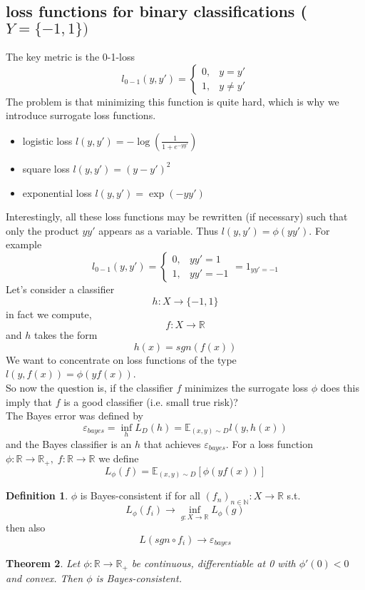 \documentclass[a4paper, 12pt]{article}
\theoremstyle{plain}
\newtheorem{theorem}{Theorem}[subsection] %
\theoremstyle{definition}
\newtheorem{definition}[theorem]{Definition} %
\theoremstyle{lemma}
\theoremstyle{remark}
\theoremstyle{example}
\begin{document}
	\subsection{loss functions for binary classifications ($Y = \{-1,1\})$}
	The key metric is the 0-1-loss \[l_{0-1}(y,y') = \begin{cases}
		0, & y=y'\\
		1, & y\neq y'
	\end{cases}\]
	The problem is that minimizing this function is quite hard, which is why we introduce surrogate loss functions. \begin{itemize}
		\item logistic loss $l(y,y') = -\log\left(\frac{1}{1+e^{-yy'}}\right)$
		\item square loss $l(y,y') = (y-y')^2$
		\item exponential loss $l(y,y') = \exp(-yy')$
	\end{itemize}
	Interestingly, all these loss functions may be rewritten (if necessary) such that only the product $yy'$ appears as a variable. Thus $l(y,y') = \phi(yy')$. For example \[l_{0-1}(y,y') = \begin{cases}
		0, & yy'= 1\\
		1, & yy' = -1
	\end{cases} = 1_{yy'=-1}\]
	Let's consider a classifier \[h:X\to\{-1,1\}\] in fact we compute, \[f:X\to\mathbb{R}\] and $h$ takes the form \[h(x) = sgn(f(x))\]
	We want to concentrate on loss functions of the type $l(y,f(x)) = \phi(yf(x))$.\\
	So now the question is, if the classifier $f$ minimizes the surrogate loss $\phi$ does this imply that $f$ is a good classifier (i.e. small true risk)?\\
	The Bayes error was defined by \[\varepsilon_{bayes} = \inf_h L_D(h) = \mathbb{E}_{(x,y)\sim D} l(y,h(x))\] and the Bayes classifier is an $h$ that achieves $\varepsilon_{bayes}$. For a loss function $\phi: \mathbb{R} \to \mathbb{R}_+, \; f:\mathbb{R}\to\mathbb{R}$ we define \[L_\phi(f) = \mathbb{E}_{(x,y)\sim D} [\phi(yf(x))]\]
	\begin{definition}
		$\phi$ is Bayes-consistent if for all $(f_n)_{n \in \mathbb{N}}: X \to \mathbb{R}$ s.t. \[L_\phi(f_i) \to \inf_{g:X\to\mathbb{R}} L_\phi(g)\]
		then also \[L(sgn\circ f_i)\to\varepsilon_{bayes}\]
	\end{definition}
	\begin{theorem}
		Let $\phi: \mathbb{R} \to \mathbb{R}_+$ be continuous, differentiable at 0 with $\phi'(0)<0$ and convex. Then $\phi$ is Bayes-consistent.
	\end{theorem}
\end{document}
